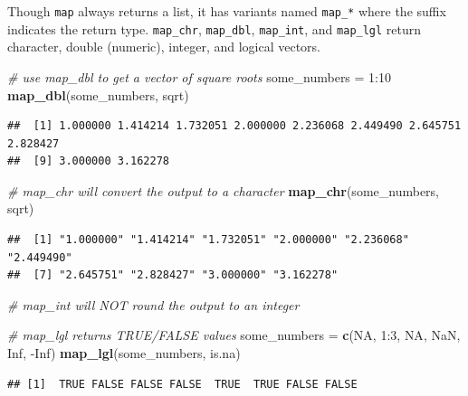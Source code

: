\documentclass[]{book}
\newenvironment{Shaded}{}{}
\newcommand{\CommentTok}[1]{\textcolor[rgb]{0.38,0.63,0.69}{\textit{#1}}}
\newcommand{\DecValTok}[1]{\textcolor[rgb]{0.25,0.63,0.44}{#1}}
\newcommand{\KeywordTok}[1]{\textcolor[rgb]{0.00,0.44,0.13}{\textbf{#1}}}
\newcommand{\NormalTok}[1]{#1}
\newcommand{\OperatorTok}[1]{\textcolor[rgb]{0.40,0.40,0.40}{#1}}
\newcommand{\OtherTok}[1]{\textcolor[rgb]{0.00,0.44,0.13}{#1}}
\newcommand{\StringTok}[1]{\textcolor[rgb]{0.25,0.44,0.63}{#1}}
\begin{document}
Though \texttt{map} always returns a list, it has variants named \texttt{map\_*} where the suffix indicates the return type.
\texttt{map\_chr}, \texttt{map\_dbl}, \texttt{map\_int}, and \texttt{map\_lgl} return character, double (numeric), integer, and logical vectors.

\begin{Shaded}
\begin{Highlighting}[]
\CommentTok{# use map_dbl to get a vector of square roots}
\NormalTok{some_numbers =}\StringTok{ }\DecValTok{1}\OperatorTok{:}\DecValTok{10}
\KeywordTok{map_dbl}\NormalTok{(some_numbers, sqrt)}
\end{Highlighting}
\end{Shaded}

\begin{verbatim}
##  [1] 1.000000 1.414214 1.732051 2.000000 2.236068 2.449490 2.645751 2.828427
##  [9] 3.000000 3.162278
\end{verbatim}

\begin{Shaded}
\begin{Highlighting}[]
\CommentTok{# map_chr will convert the output to a character}
\KeywordTok{map_chr}\NormalTok{(some_numbers, sqrt)}
\end{Highlighting}
\end{Shaded}

\begin{verbatim}
##  [1] "1.000000" "1.414214" "1.732051" "2.000000" "2.236068" "2.449490"
##  [7] "2.645751" "2.828427" "3.000000" "3.162278"
\end{verbatim}

\begin{Shaded}
\begin{Highlighting}[]
\CommentTok{# map_int will NOT round the output to an integer}

\CommentTok{# map_lgl returns TRUE/FALSE values}
\NormalTok{some_numbers =}\StringTok{ }\KeywordTok{c}\NormalTok{(}\OtherTok{NA}\NormalTok{, }\DecValTok{1}\OperatorTok{:}\DecValTok{3}\NormalTok{, }\OtherTok{NA}\NormalTok{, }\OtherTok{NaN}\NormalTok{, }\OtherTok{Inf}\NormalTok{, }\OperatorTok{-}\OtherTok{Inf}\NormalTok{)}
\KeywordTok{map_lgl}\NormalTok{(some_numbers, is.na)}
\end{Highlighting}
\end{Shaded}

\begin{verbatim}
## [1]  TRUE FALSE FALSE FALSE  TRUE  TRUE FALSE FALSE
\end{verbatim}
\end{document}
